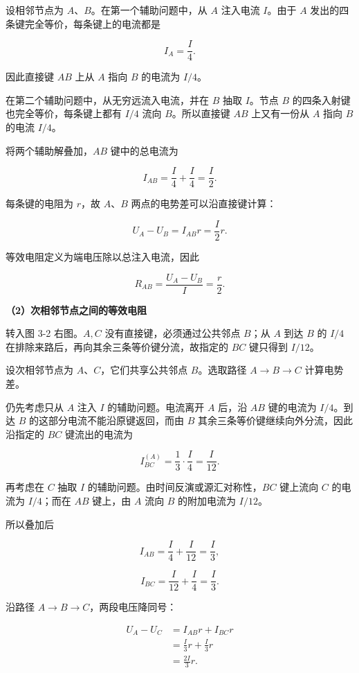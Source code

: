 \documentclass[12pt,a4paper,UTF8]{ctexart}
\begin{document}
设相邻节点为 \(A\)、\(B\)。在第一个辅助问题中，从 \(A\) 注入电流
\(I\)。由于 \(A\) 发出的四条键完全等价，每条键上的电流都是

\[
I_A=\frac I4.
\tag{1}
\]

因此直接键 \(AB\) 上从 \(A\) 指向 \(B\) 的电流为 \(I/4\)。

在第二个辅助问题中，从无穷远流入电流，并在 \(B\) 抽取 \(I\)。节点 \(B\)
的四条入射键也完全等价，每条键上都有 \(I/4\) 流向 \(B\)。所以直接键
\(AB\) 上又有一份从 \(A\) 指向 \(B\) 的电流 \(I/4\)。

将两个辅助解叠加，\(AB\) 键中的总电流为

\[
I_{AB}=\frac I4+\frac I4=\frac I2.
\tag{2}
\]

每条键的电阻为 \(r\)，故 \(A\)、\(B\) 两点的电势差可以沿直接键计算：

\[
U_A-U_B=I_{AB}r=\frac I2r.
\tag{3}
\]

等效电阻定义为端电压除以总注入电流，因此

\[
\boxed{R_{AB}=\frac{U_A-U_B}{I}=\frac r2}.
\tag{4}
\]

\textbf{（2）次相邻节点之间的等效电阻}

转入图 3-2 右图。\(A,C\) 没有直接键，必须通过公共邻点 \(B\)；从 \(A\)
到达 \(B\) 的 \(I/4\) 在排除来路后，再向其余三条等价键分流，故指定的
\(BC\) 键只得到 \(I/12\)。

设次相邻节点为 \(A\)、\(C\)，它们共享公共邻点 \(B\)。选取路径
\(A\to B\to C\) 计算电势差。

仍先考虑只从 \(A\) 注入 \(I\) 的辅助问题。电流离开 \(A\) 后，沿 \(AB\)
键的电流为 \(I/4\)。到达 \(B\) 的这部分电流不能沿原键返回，而由 \(B\)
其余三条等价键继续向外分流，因此沿指定的 \(BC\) 键流出的电流为

\[
I_{BC}^{(A)}=\frac13\cdot\frac I4=\frac I{12}.
\tag{5}
\]

再考虑在 \(C\) 抽取 \(I\) 的辅助问题。由时间反演或源汇对称性，\(BC\)
键上流向 \(C\) 的电流为 \(I/4\)；而在 \(AB\) 键上，由 \(A\) 流向 \(B\)
的附加电流为 \(I/12\)。

所以叠加后

\[
I_{AB}=\frac I4+\frac I{12}=\frac I3,
\tag{6}
\]

\[
I_{BC}=\frac I{12}+\frac I4=\frac I3.
\tag{7}
\]

沿路径 \(A\to B\to C\)，两段电压降同号：

\[
\begin{aligned}
U_A-U_C
&=I_{AB}r+I_{BC}r\\
&=\frac I3r+\frac I3r\\
&=\frac{2I}{3}r.
\end{aligned}
\tag{8}
\]
\end{document}
